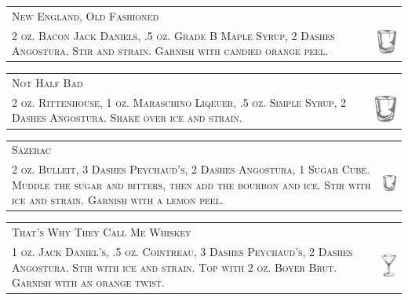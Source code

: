 \documentclass{article}
\begin{document}
\begin{tabular}{b{2.5in} m{0.625in}}
  \multicolumn{2}{p{3.0in}}{\centering\Huge\textsc{New England, Old Fashioned}} \\ 
  
  \textsc{2 oz. Bacon Jack Daniels, .5 oz. Grade B Maple Syrup, 2
    Dashes Angostura. Stir and strain. Garnish with candied orange
    peel.} & \includegraphics[width=0.5in]{rocks_glass.png}
\end{tabular}

\begin{tabular}{b{2.5in} m{0.625in}}
  \multicolumn{2}{p{3.0in}}{\centering\Huge\textsc{Not Half Bad}} \\ 
  
  \textsc{2 oz. Rittenhouse, 1 oz. Maraschino Liqeuer, .5 oz. Simple
    Syrup, 2 Dashes Angostura. Shake over ice and strain.} &
  \includegraphics[width=0.5in]{rocks_glass.png}
\end{tabular}

\begin{tabular}{b{2.5in} m{0.625in}}
  \multicolumn{2}{p{3.0in}}{\centering\Huge\textsc{Sazerac}} \\ 
  
  \textsc{2 oz. Bulleit, 3 Dashes Peychaud's, 2 Dashes Angostura, 1
    Sugar Cube.  Muddle the sugar and bitters, then add the bourbon
    and ice. Stir with ice and strain. Garnish with a lemon peel.} &
  \includegraphics[width=0.5in]{rocks_glass.png}
\end{tabular}

\begin{tabular}{b{2.5in} m{0.625in}}
  \multicolumn{2}{p{3.0in}}{\centering\Huge\textsc{That's Why They Call Me Whiskey}} \\ 
  
  \textsc{1 oz. Jack Daniel's, .5 oz. Cointreau, 3 Dashes Peychaud's,
    2 Dashes Angostura. Stir with ice and strain. Top with 2 oz.
    Boyer Brut. Garnish with an orange twist.} &
  \includegraphics[width=0.5in]{goblet.png}
\end{tabular}
\end{document}
